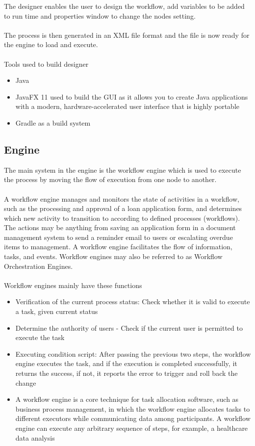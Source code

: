The designer enables the user to design the workflow, add variables to be added to run time and
properties window to change the nodes setting.\\\\
The process is then generated in an XML file format and the file is now ready for the engine to load
and execute.\\\\
Tools used to build designer
\begin{itemize}
    \item Java
    \item JavaFX 11 used to build the GUI as it allows you to create Java applications with a
    modern, hardware-accelerated user interface that is highly portable
    \item Gradle as a build system
\end{itemize}

\subsection{Engine}

The main system in the engine is the workflow engine which is used to execute the process by moving
the flow of execution from one node to another.\\\\
A workflow engine manages and monitors the state of activities in a workflow, such as the processing
and approval of a loan application form, and determines which new activity to transition to according
to defined processes (workflows). The actions may be anything from saving an application form in a
document management system to send a reminder email to users or escalating overdue items to
management. A workflow engine facilitates the flow of information, tasks, and events. Workflow
engines may also be referred to as Workflow Orchestration Engines.\\\\
Workflow engines mainly have these functions

\begin{itemize}
    \item Verification of the current process status: Check whether it is valid to execute a task, given
    current status
    \item Determine the authority of users - Check if the current user is permitted to execute the task
    \item Executing condition script: After passing the previous two steps, the workflow engine
    executes the task, and if the execution is completed successfully, it returns the success, if not,
    it reports the error to trigger and roll back the change
    \item A workflow engine is a core technique for task allocation software, such as business process
    management, in which the workflow engine allocates tasks to different executors while
    communicating data among participants. A workflow engine can execute any arbitrary
    sequence of steps, for example, a healthcare data analysis
\end{itemize}

